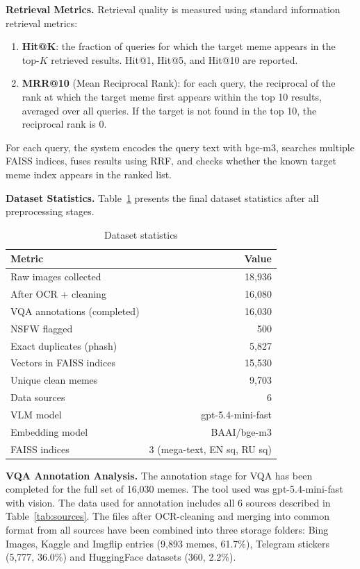\documentclass[a4paper,12pt]{article}
\begin{document}
\textbf{Retrieval Metrics.} Retrieval quality is measured using standard information retrieval metrics:
\begin{enumerate}
    \item \textbf{Hit@K}: the fraction of queries for which the target meme appears in the top-$K$ retrieved results. Hit@1, Hit@5, and Hit@10 are reported.
    \item \textbf{MRR@10} (Mean Reciprocal Rank): for each query, the reciprocal of the rank at which the target meme first appears within the top 10 results, averaged over all queries. If the target is not found in the top 10, the reciprocal rank is 0.
\end{enumerate}

For each query, the system encodes the query text with bge-m3, searches multiple FAISS indices, fuses results using RRF, and checks whether the known target meme index appears in the ranked list.

\textbf{Dataset Statistics.} Table~\ref{tab:dataset} presents the final dataset statistics after all preprocessing stages.

\begin{table}[H]
\centering
\caption{Dataset statistics}
\label{tab:dataset}
\begin{tabular}{|l|r|}
\hline
\textbf{Metric} & \textbf{Value} \\
\hline
Raw images collected & 18,936 \\
\hline
After OCR + cleaning & 16,080 \\
\hline
VQA annotations (completed) & 16,030 \\
\hline
NSFW flagged & 500 \\
\hline
Exact duplicates (phash) & 5,827 \\
\hline
Vectors in FAISS indices & 15,530 \\
\hline
Unique clean memes & 9,703 \\
\hline
Data sources & 6 \\
\hline
VLM model & gpt-5.4-mini-fast  \\
\hline
Embedding model & BAAI/bge-m3  \\
\hline
FAISS indices & 3 (mega-text, EN sq, RU sq) \\
\hline
\end{tabular}
\end{table}

\textbf{VQA Annotation Analysis.} The annotation stage for VQA has been completed for the full set of 16,030 memes. The tool used was gpt-5.4-mini-fast with vision. The data used for annotation includes all 6 sources described in Table~\ref{tab:sources}. The files after OCR-cleaning and merging into common format from all sources have been combined into three storage folders: Bing Images, Kaggle and Imgflip entries (9,893 memes, 61.7\%), Telegram stickers (5,777, 36.0\%) and HuggingFace datasets (360, 2.2\%).
\end{document}

